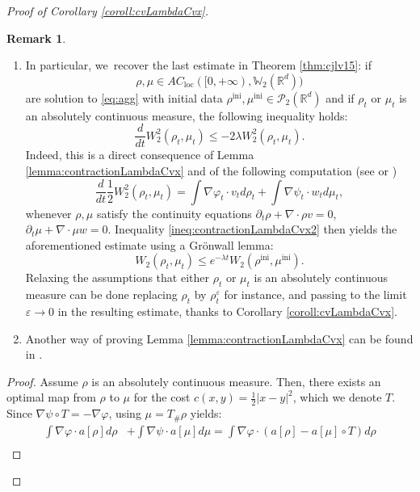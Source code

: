 \documentclass[JEP,XML,SOM,Unicode, NoFloatCountersInSection,published]{cedram}
\newcommand{\ini}{\mathrm{ini}}
\def\RR{\mathbb{R}}
\def\WW{\mathbb{W}}
\def\eps{\varepsilon}
\def\pa{\partial}
\def\calP{{\mathcal P}}
\theoremstyle{plain}
\theoremstyle{definition}
\newtheorem{remark}[theorem]{Remark}
\begin{document}
\begin{proof}[Proof of Corollary \ref{coroll:cvLambdaCvx}]
\skpt
\begin{remark}
\begin{enumerate}
\item In particular, we~recover the last estimate in Theorem \ref{thm:cjlv15}: if
\[
\rho, \mu \in AC_\mathrm{loc}([0,+\infty), \WW _2(\RR^d))
\]
are solution to \eqref{eq:agg} with initial data $\rho^{\ini}, \mu^{\ini} \in \calP_2(\RR^d)$ and if $\rho_t$ or $\mu_t$ is an absolutely continuous measure, the following inequality holds:
\begin{equation}\label{ineq:contractionLambdaCvx2}
\frac{d}{dt} W_2^2(\rho_t, \mu_t) \leq -2\lambda W_2^2(\rho_t, \mu_t).
\end{equation}
Indeed, this is a direct consequence of Lemma \ref{lemma:contractionLambdaCvx} and of the following computation (see \cite[Th.\,5.25]{otam15} or \cite[Th.\,8.4.7]{ambrosio08})
\begin{equation}\label{eq:derW2}
\frac{d}{dt} \frac 12 W_2^2(\rho_t, \mu_t) = \int \nabla \varphi_t \cdot v_t d\rho_t + \int \nabla \psi_t \cdot w_t d\mu_t,
\end{equation}
whenever $\rho, \mu$ satisfy the continuity equations $\pa_t \rho + \nabla \cdot \rho v = 0$, $\pa_t \mu + \nabla \cdot \mu w = 0$. Inequality \eqref{ineq:contractionLambdaCvx2} then yields the aforementioned estimate using a Grönwall lemma:
\begin{equation}
W_2(\rho_t, \mu_t) \leq e^{-\lambda t} W_2(\rho^{\ini}, \mu^{\ini}).
\end{equation}
Relaxing the assumptions that either $\rho_t$ or $\mu_t$ is an absolutely continuous measure can be done replacing $\rho_t$ by $\rho^\eps_t$ for instance, and passing to the limit $\eps \to 0$ in the resulting estimate, thanks to Corollary \ref{coroll:cvLambdaCvx}.
\item Another way of proving Lemma \ref{lemma:contractionLambdaCvx} can be found in \cite[Lem.\,4.12]{santambrogio_bourbaki}.
\end{enumerate}
\end{remark}
\begin{proof}
Assume $\rho$ is an absolutely continuous measure. Then, there exists an optimal map from $\rho$ to $\mu$ for the cost $c(x,y) = \frac 12 |x-y|^2$, which we denote $T$. Since $\nabla \psi \circ T = - \nabla \varphi$, using $\mu = T_\# \rho$ yields:
\begin{align*}
\int \nabla \varphi \cdot a[\rho] d\rho & + \int \nabla \psi \cdot a[\mu] d\mu = \int \nabla \varphi \cdot (a[\rho] - a[\mu] \circ T) d\rho \\

\end{align*}
\end{proof}
\end{proof}
\end{document}
